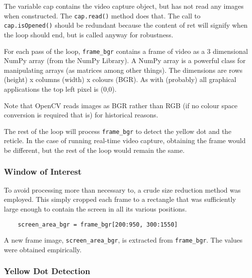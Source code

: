 \documentclass[final]{cmpreport_02}
\begin{document}
The variable cap contains the video capture object, but has not read any images when constructed. The \verb|cap.read()| method does that. The call to \verb|cap.isOpened()| should be redundant because the content of ret will signify when the loop should end, but is called anyway for robustness.

For each pass of the loop, \verb|frame_bgr| contains a frame of video as a 3 dimensional NumPy array (from the NumPy Library). A NumPy array is a powerful class for manipulating arrays (as matrices among other things). The dimensions are rows (height) x columns (width) x colours (BGR). As with (probably) all graphical applications the top left pixel is (0,0).

Note that OpenCV reads images as BGR rather than RGB (if no colour space conversion is required that is) for historical reasons.

The rest of the loop will process \verb|frame_bgr| to detect the yellow dot and the reticle. In the case of running real-time video capture, obtaining the frame would be different, but the rest of the loop would remain the same.

\subsubsection{Window of Interest}

To avoid processing more than necessary to, a crude size reduction method was employed. This simply cropped each frame to a rectangle that was sufficiently large enough to contain the screen in all its various positions.

\begin{verbatim}
	screen_area_bgr = frame_bgr[200:950, 300:1550]
\end{verbatim}
\noindent
A new frame image, \verb|screen_area_bgr|, is extracted from \verb|frame_bgr|. The values were obtained empirically.

\subsubsection{Yellow Dot Detection}
\end{document}
